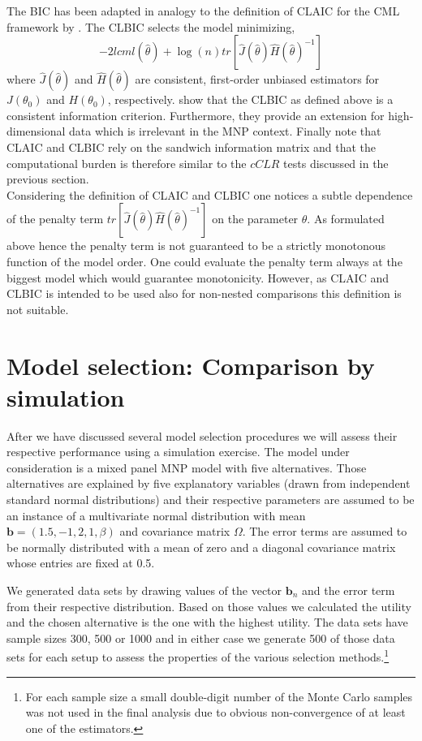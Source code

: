 \documentclass[12pt, a4paper]{article}
\numberwithin{defcounter}{section}
\numberwithin{excounter}{section}
\begin{document}
The \ac{BIC} has been adapted in analogy to the definition of \ac{CLAIC} for the \ac{CML} framework by \cite{gao2010}. The \ac{CLBIC}  selects the model minimizing,
  \begin{equation}
-2lcml(\hat{\theta}) + \log(n) tr[\hat{J}(\hat{\theta})\hat{H}(\hat{\theta})^{-1}]
  \end{equation}
  where $\hat{J}(\hat{\theta})$ and $\hat{H}(\hat{\theta})$ are consistent, first-order unbiased
  estimators for $J(\theta_0)$ and $H(\theta_0)$, respectively. \cite{gao2010} show that the \ac{CLBIC} as defined above is a consistent information criterion. Furthermore, they provide an extension for high-dimensional data which is irrelevant in the \ac{MNP} context. Finally note that \ac{CLAIC} and \ac{CLBIC} rely on the sandwich information matrix and that the computational burden is therefore similar to the $cCLR$ tests discussed in the previous section.
\\
Considering the definition of \ac{CLAIC} and CLBIC one notices a subtle dependence of the penalty 
term $tr[\hat{J}(\hat{\theta})\hat{H}(\hat{\theta})^{-1}]$ on the parameter 
$\theta$. As formulated above hence the penalty term is not guaranteed to be a 
strictly monotonous function of the model order. One could evaluate the penalty term always at the biggest model which would guarantee monotonicity.
However, as \ac{CLAIC} and CLBIC is intended to be used also for non-nested comparisons this definition is not suitable. 


\section{Model selection: Comparison by simulation}
\label{chap:simu}
After we have discussed several model selection procedures we will assess their respective performance using a simulation exercise. The model under consideration is a  mixed panel \ac{MNP} model with five alternatives. Those alternatives are explained by five explanatory variables (drawn from independent standard normal distributions) and their respective parameters are assumed to be an instance of a multivariate normal distribution with  mean
$\textbf{b} = (1.5, -1, 2, 1, \beta)$ and covariance matrix $\Omega$. The error terms are assumed to be normally distributed with a mean of zero and a diagonal covariance matrix whose entries are fixed at 0.5. 

We generated data sets by drawing values of the vector $\textbf{b}_n$ and the error term from their respective distribution. Based on those values we calculated the utility and the chosen alternative is the one with the highest utility. The data sets have sample sizes 300, 500 or 1000 and in either case we generate 500 of those data sets for each setup to assess the properties of the various selection methods.\footnote{For each sample size a small double-digit number of the Monte Carlo samples was not used in the final analysis due to obvious non-convergence of at least one of the estimators.}
\end{document}
